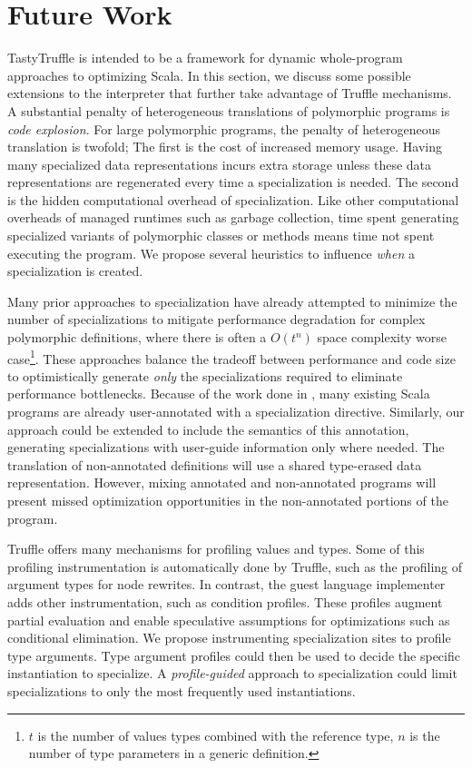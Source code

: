\chapter{Future Work}

TastyTruffle is intended to be a framework for dynamic whole-program approaches to optimizing Scala.
In this section, we discuss some possible extensions to the interpreter that further take advantage of Truffle mechanisms.
A substantial penalty of heterogeneous translations of polymorphic programs is \textit{code explosion}.
For large polymorphic programs, the penalty of heterogeneous translation is twofold; 
The first is the cost of increased memory usage.
Having many specialized data representations incurs extra storage unless these data representations are regenerated every time a specialization is needed.
The second is the hidden computational overhead of specialization. 
Like other computational overheads of managed runtimes such as garbage collection, time spent generating specialized variants of polymorphic classes or methods means time not spent executing the program.
We propose several heuristics to influence \textit{when} a specialization is created.

Many prior approaches to specialization have already attempted to minimize the number of specializations to mitigate performance degradation for complex polymorphic definitions, where there is often a \(O(t^n)\) space complexity worse case\footnote{$t$ is the number of values types combined with the reference type, $n$ is the number of type parameters in a generic definition.}.
These approaches balance the tradeoff between performance and code size to optimistically generate \textit{only} the specializations required to eliminate performance bottlenecks.
Because of the work done in \cite{scala:specialization}, many existing Scala programs are already user-annotated with a specialization directive.
Similarly, our approach could be extended to include the semantics of this annotation, generating specializations with user-guide information only where needed.
The translation of non-annotated definitions will use a shared type-erased data representation.
However, mixing annotated and non-annotated programs will present missed optimization opportunities in the non-annotated portions of the program.

Truffle offers many mechanisms for profiling values and types.
Some of this profiling instrumentation is automatically done by Truffle, such as the profiling of argument types for node rewrites. In contrast, the guest language implementer adds other instrumentation,  such as condition profiles.
These profiles augment partial evaluation and enable speculative assumptions for optimizations such as conditional elimination.
We propose instrumenting specialization sites to profile type arguments.
Type argument profiles could then be used to decide the specific instantiation to specialize.
A \textit{profile-guided} approach to specialization could limit specializations to only the most frequently used instantiations.

